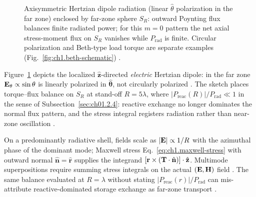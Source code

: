 \begin{figure}[b]
\centering
{}
\caption{Axisymmetric Hertzian dipole radiation (linear $\hat{\theta}$ polarization in the far zone) enclosed by far-zone sphere $S_R$: outward Poynting flux balances finite radiated power; for this $m{=}0$ pattern the net axial stress-moment flux on $S_R$ vanishes while $P_{\mathrm{rad}}$ is finite. Circular polarization and Beth-type load torque are separate examples (Fig.~\ref{fig:ch1.beth-schematic}) \cite{stratton1941,beth1936}.}
\label{fig:ch1.ex61-beth-helical-sketch}
\end{figure}

Figure~\ref{fig:ch1.ex61-beth-helical-sketch} depicts the localized $\hat{\mathbf{z}}$-directed \emph{electric} Hertzian dipole: in the far zone $\mathbf{E}_\theta\propto\sin\theta$ is linearly polarized in $\hat{\boldsymbol{\theta}}$, not circularly polarized \cite{stratton1941,harrington2001}. The sketch places torque--flux balance on $S_R$ at stand-off \(R=5\lambda\), where \(|P_{\mathrm{reac}}(R)|/P_{\mathrm{rad}}\ll 1\) in the sense of Subsection~\ref{sec:ch01.2.4}: reactive exchange no longer dominates the normal flux pattern, and the stress integral registers radiation rather than near-zone oscillation \cite{stratton1941}.

On a predominantly radiative shell, fields scale as \(|\mathbf{E}|\propto 1/R\) with the azimuthal phase of the dominant mode; Maxwell stress Eq.~\eqref{eq:ch1.maxwell-stress} with outward normal \(\hat{\mathbf{n}}=\hat{\mathbf{r}}\) supplies the integrand \([\mathbf{r}\times(\mathbf{T}\cdot\hat{\mathbf{n}})]\cdot\hat{\mathbf{z}}\). Multimode superpositions require summing stress integrals on the actual $(\mathbf{E},\mathbf{H})$ field \cite{stratton1941}. The same balance evaluated at \(R=\lambda\) without stating \(|P_{\mathrm{reac}}(r)|/P_{\mathrm{rad}}\) can mis-attribute reactive-dominated storage exchange as far-zone transport \cite{stratton1941}.

